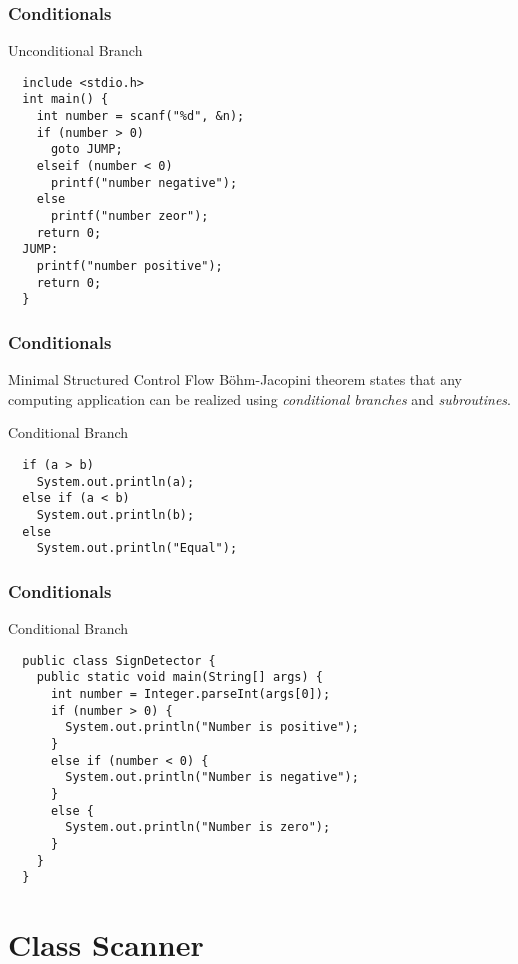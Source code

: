 \documentclass[10pt, compress]{beamer}
\begin{document}
\begin{frame}[fragile]
  \frametitle{Conditionals}
  \begin{block}{Unconditional Branch}
    \begin{verbatim}
  include <stdio.h>
  int main() {
    int number = scanf("%d", &n);
    if (number > 0)
      goto JUMP;
    elseif (number < 0)
      printf("number negative");
    else
      printf("number zeor");
    return 0;
  JUMP:
    printf("number positive");
    return 0;
  }
    \end{verbatim}
  \end{block}
\end{frame}

\begin{frame}[fragile]
  \frametitle{Conditionals}
  \begin{block}{Minimal Structured Control Flow}
    Böhm-Jacopini theorem states that any computing application can be realized using \emph{conditional branches} and \emph{subroutines}.
  \end{block}
  \begin{block}{Conditional Branch}
    \begin{verbatim}
  if (a > b)
    System.out.println(a);
  else if (a < b)
    System.out.println(b);
  else
    System.out.println("Equal");
    \end{verbatim}
  \end{block}
\end{frame}

\begin{frame}[fragile]
  \frametitle{Conditionals}
  \begin{block}{Conditional Branch}
    \begin{verbatim}
  public class SignDetector {
    public static void main(String[] args) {
      int number = Integer.parseInt(args[0]);
      if (number > 0) {
        System.out.println("Number is positive");
      }
      else if (number < 0) {
        System.out.println("Number is negative");
      }
      else {
        System.out.println("Number is zero");
      }
    }
  }
    \end{verbatim}
  \end{block}
\end{frame}

\section{Class Scanner}
\end{document}
